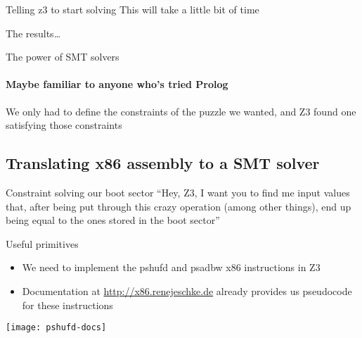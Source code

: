 \begin{frame}{Telling z3 to start solving}
    This will take a little bit of time \pause \\

\end{frame}

\begin{frame}{The results\ldots}
    \begin{center}
    \end{center}
\end{frame}

\begin{frame}{The power of SMT solvers}
    \framesubtitle{Maybe familiar to anyone who's tried Prolog}
    \begin{center}
        {\Large
            We only had to \alert{define the constraints of the puzzle we
            wanted}, and Z3 found one satisfying those constraints
        }
    \end{center}
\end{frame}

\subsection{Translating x86 assembly to a SMT solver}

\begin{frame}{Constraint solving our boot sector}
    ``Hey, Z3, I want you to find me input values that, after being put through
    this crazy operation (among other things), end up being equal to the ones
    stored in the boot sector''
    \\
    \begin{center}
    \end{center}
\end{frame}

\begin{frame}{Useful primitives}
    \begin{itemize}
        \item We need to implement the pshufd and psadbw x86 instructions
              in Z3
        \item Documentation at \url{http://x86.renejeschke.de} already
              provides us pseudocode for these instructions
    \end{itemize}

    \begin{center}
        \texttt{[image: pshufd-docs]}
    \end{center}
\end{frame}

